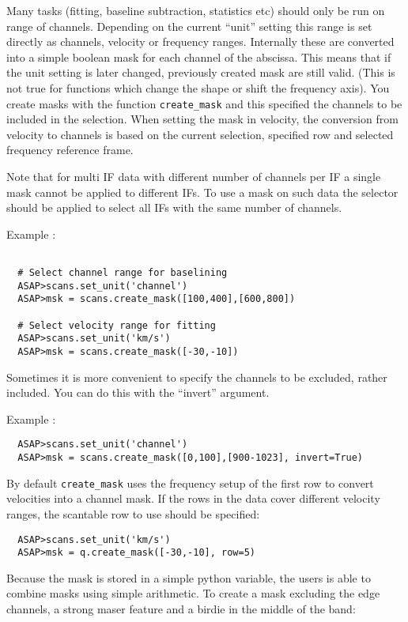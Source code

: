 \documentclass[11pt]{article}
\newcommand{\cmd}[1]{{\tt #1}}
\begin{document}

Many tasks (fitting, baseline subtraction, statistics etc) should only
be run on range of channels. Depending on the current ``unit'' setting
this range is set directly as channels, velocity or frequency
ranges. Internally these are converted into a simple boolean mask for
each channel of the abscissa. This means that if the unit setting is
later changed, previously created mask are still valid. (This is not
true for functions which change the shape or shift the frequency
axis).  You create masks with the function \cmd{create\_mask} and this
specified the channels to be included in the selection. When setting
the mask in velocity, the conversion from velocity to channels is
based on the current selection, specified row and selected frequency
reference frame.


Note that for multi IF data with different number of channels per IF a
single mask cannot be applied to different IFs. To use a mask on such
data the selector should be applied to select all IFs with the same
number of channels.

Example :
\begin{verbatim}

  # Select channel range for baselining
  ASAP>scans.set_unit('channel')
  ASAP>msk = scans.create_mask([100,400],[600,800])

  # Select velocity range for fitting
  ASAP>scans.set_unit('km/s')
  ASAP>msk = scans.create_mask([-30,-10])
\end{verbatim}

Sometimes it is more convenient to specify the channels to be
excluded, rather included.  You can do this with the ``invert''
argument.

Example :
\begin{verbatim}
  ASAP>scans.set_unit('channel')
  ASAP>msk = scans.create_mask([0,100],[900-1023], invert=True)
\end{verbatim}

By default \cmd{create\_mask} uses the frequency setup of the first row
to convert velocities into a channel mask. If the rows in the data
cover different velocity ranges, the scantable row to use should be
specified:

\begin{verbatim}
  ASAP>scans.set_unit('km/s')
  ASAP>msk = q.create_mask([-30,-10], row=5)
\end{verbatim}

Because the mask is stored in a simple python variable, the users is
able to combine masks using simple arithmetic. To create a mask
excluding the edge channels, a strong maser feature and a birdie in
the middle of the band:
\end{document}
